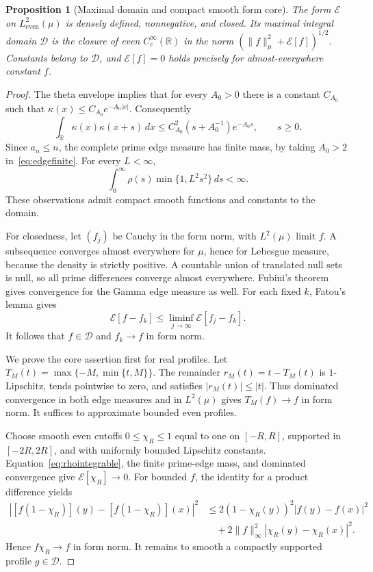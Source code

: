 \documentclass[11pt,a4paper]{article}
\numberwithin{equation}{section}
\newtheorem{proposition}[theorem]{Proposition}
\theoremstyle{definition}
\theoremstyle{remark}
\newcommand{\R}{\mathbb R}
\newcommand{\E}{\mathcal E}
\newcommand{\D}{\mathcal D}
\newcommand{\He}{L^2_{\mathrm{even}}(\mu)}
\newcommand{\norm}[1]{\lVert #1\rVert}
\begin{document}
\begin{proposition}[Maximal domain and compact smooth form core]\label{prop:core}
The form $\E$ on $\He$ is densely defined, nonnegative, and closed. Its maximal integral domain $\D$ is the closure of even $C_c^\infty(\R)$ in the norm $(\norm{f}_\mu^2+\E[f])^{1/2}$. Constants belong to $\D$, and $\E[f]=0$ holds precisely for almost-everywhere constant $f$.
\end{proposition}
\begin{proof}
The theta envelope implies that for every $A_0>0$ there is a constant $C_{A_0}$ such that $\kappa(x)\le C_{A_0}e^{-A_0|x|}$. Consequently
\begin{equation}\label{eq:edgefinite}
 \int_\R\kappa(x)\kappa(x+s)\,dx
 \le C_{A_0}^2(s+A_0^{-1})e^{-A_0s},\qquad s\ge0.
\end{equation}
Since $a_n\le n$, the complete prime edge measure has finite mass, by taking $A_0>2$ in~\eqref{eq:edgefinite}. For every $L<\infty$,
\begin{equation}\label{eq:rhointegrable}
 \int_0^\infty\rho(s)\min\{1,L^2s^2\}\,ds<\infty.
\end{equation}
These observations admit compact smooth functions and constants to the domain.

For closedness, let $(f_j)$ be Cauchy in the form norm, with $L^2(\mu)$ limit $f$. A subsequence converges almost everywhere for $\mu$, hence for Lebesgue measure, because the density is strictly positive. A countable union of translated null sets is null, so all prime differences converge almost everywhere. Fubini's theorem gives convergence for the Gamma edge measure as well. For each fixed $k$, Fatou's lemma gives
\[
 \E[f-f_k]\le\liminf_{j\to\infty}\E[f_j-f_k].
\]
It follows that $f\in\D$ and $f_k\to f$ in form norm.

We prove the core assertion first for real profiles. Let $T_M(t)=\max\{-M,\min\{t,M\}\}$. The remainder $r_M(t)=t-T_M(t)$ is $1$-Lipschitz, tends pointwise to zero, and satisfies $|r_M(t)|\le|t|$. Thus dominated convergence in both edge measures and in $L^2(\mu)$ gives $T_M(f)\to f$ in form norm. It suffices to approximate bounded even profiles.

Choose smooth even cutoffs $0\le\chi_R\le1$ equal to one on $[-R,R]$, supported in $[-2R,2R]$, and with uniformly bounded Lipschitz constants. Equation~\eqref{eq:rhointegrable}, the finite prime-edge mass, and dominated convergence give $\E[\chi_R]\to0$. For bounded $f$, the identity for a product difference yields
\begin{align*}
 |[f(1-\chi_R)](y)-[f(1-\chi_R)](x)|^2
 &\le2(1-\chi_R(y))^2|f(y)-f(x)|^2\\
 &\quad+2\norm{f}_\infty^2|\chi_R(y)-\chi_R(x)|^2.
\end{align*}
Hence $f\chi_R\to f$ in form norm. It remains to smooth a compactly supported profile $g\in\D$.


\end{proof}
\end{document}

